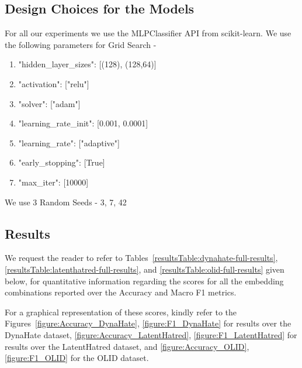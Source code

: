 \documentclass{article} %
\begin{document}
\subsection{Design Choices for the Models}
\label{model-params}

For all our experiments we use the MLPClassifier API from scikit-learn. We use the following parameters for Grid Search - 

\begin{enumerate}
    \item "hidden\_layer\_sizes": [(128), (128,64)]
    \item "activation": ["relu"]
    \item "solver": ["adam"]
    \item "learning\_rate\_init": [0.001, 0.0001]
    \item "learning\_rate": ["adaptive"]
    \item "early\_stopping": [True]
    \item "max\_iter": [10000]
\end{enumerate}

We use 3 Random Seeds - {3, 7, 42}

\subsection{Results}
\label{exp-results}

We request the reader to refer to Tables~\ref{resultsTable:dynahate-full-results}, \ref{resultsTable:latenthatred-full-results}, and \ref{resultsTable:olid-full-results} given below, for quantitative information regarding the scores for all the embedding combinations reported over the Accuracy and Macro F1 metrics.

For a graphical representation of these scores, kindly refer to the Figures~\ref{figure:Accuracy_DynaHate}, \ref{figure:F1_DynaHate} for results over the DynaHate dataset, \ref{figure:Accuracy_LatentHatred}, \ref{figure:F1_LatentHatred} for results over the LatentHatred dataset, and \ref{figure:Accuracy_OLID}, \ref{figure:F1_OLID} for the OLID dataset.
\end{document}
